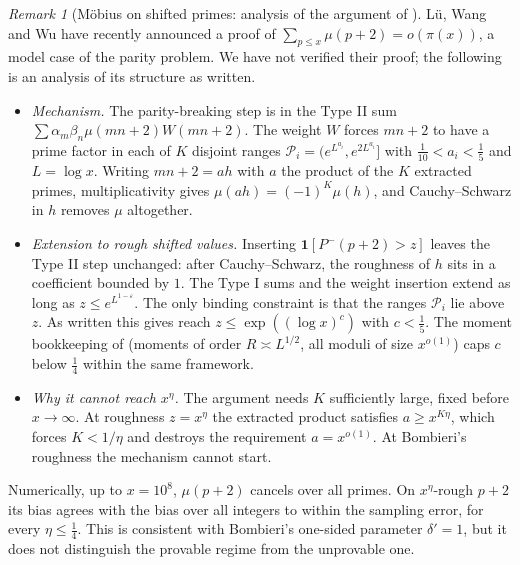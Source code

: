 \documentclass[11pt]{amsart}
\theoremstyle{definition}
\theoremstyle{remark}
\newtheorem{remark}[theorem]{Remark}
\begin{document}
\begin{remark}[Möbius on shifted primes: analysis of the argument of \cite{LWW26}]\label{rem:lww-ceiling}
Lü, Wang and Wu \cite{LWW26} have recently announced a proof of $\sum_{p\le x}\mu(p+2)=o(\pi(x))$, a model case of the parity problem. We have not verified their proof; the following is an analysis of its structure as written.
\begin{itemize}
\item \emph{Mechanism.} The parity-breaking step is in the Type II sum $\sum\alpha_m\beta_n\mu(mn+2)W(mn+2)$. The weight $W$ forces $mn+2$ to have a prime factor in each of $K$ disjoint ranges $\mathcal P_i=(e^{L^{a_i}},e^{2L^{a_i}}]$ with $\frac1{10}<a_i<\frac15$ and $L=\log x$. Writing $mn+2=ah$ with $a$ the product of the $K$ extracted primes, multiplicativity gives $\mu(ah)=(-1)^K\mu(h)$, and Cauchy--Schwarz in $h$ removes $\mu$ altogether.
\item \emph{Extension to rough shifted values.} Inserting $\mathbf 1[P^-(p+2)>z]$ leaves the Type II step unchanged: after Cauchy--Schwarz, the roughness of $h$ sits in a coefficient bounded by $1$. The Type I sums and the weight insertion extend as long as $z\le e^{L^{1-\varepsilon}}$. The only binding constraint is that the ranges $\mathcal P_i$ lie above $z$. As written this gives reach $z\le\exp((\log x)^c)$ with $c<\frac15$. The moment bookkeeping of \cite[\S4.3]{LWW26} (moments of order $R\asymp L^{1/2}$, all moduli of size $x^{o(1)}$) caps $c$ below $\frac14$ within the same framework.
\item \emph{Why it cannot reach $x^\eta$.} The argument needs $K$ sufficiently large, fixed before $x\to\infty$. At roughness $z=x^\eta$ the extracted product satisfies $a\ge x^{K\eta}$, which forces $K<1/\eta$ and destroys the requirement $a=x^{o(1)}$. At Bombieri's roughness the mechanism cannot start.
\end{itemize}
Numerically, up to $x=10^8$, $\mu(p+2)$ cancels over all primes. On $x^\eta$-rough $p+2$ its bias agrees with the bias over all integers to within the sampling error, for every $\eta\le\frac14$. This is consistent with Bombieri's one-sided parameter $\delta'=1$, but it does not distinguish the provable regime from the unprovable one.
\end{remark}
\end{document}
